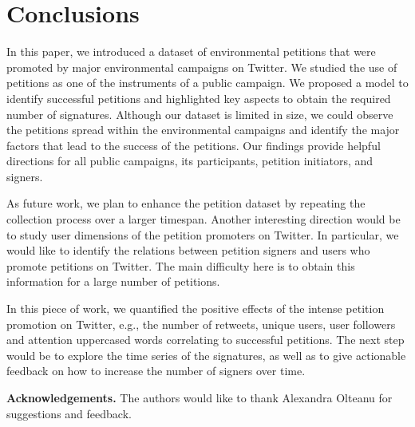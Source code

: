 \section{Conclusions}
In this paper, we introduced a dataset of environmental petitions that were promoted by major environmental campaigns on Twitter.
We studied the use of petitions as one of the instruments of a public campaign.
We proposed a model to identify successful petitions and highlighted key aspects to obtain the required number of signatures.
Although our dataset is limited in size, we could observe the petitions spread within the environmental campaigns and identify the major factors that lead to the success of the petitions.
Our findings provide helpful directions for all public campaigns, its participants, petition initiators, and signers.

As future work, we plan to enhance the petition dataset by repeating the collection process over a larger timespan.
Another interesting direction would be to study user dimensions of the petition promoters on Twitter. In particular, we would like to identify the relations between petition signers and users who promote petitions on Twitter. The main difficulty here is to obtain this information for a large number of petitions.

In this piece of work, we quantified the positive effects of the intense petition promotion on Twitter, e.g., the number of retweets, unique users, user followers and attention uppercased words correlating to successful petitions.
The next step would be to explore the time series of the signatures, as well as to give actionable feedback on how to increase the number of signers over time.

\noindent \textbf{Acknowledgements.} The authors would like to thank Alexandra Olteanu for suggestions and feedback.